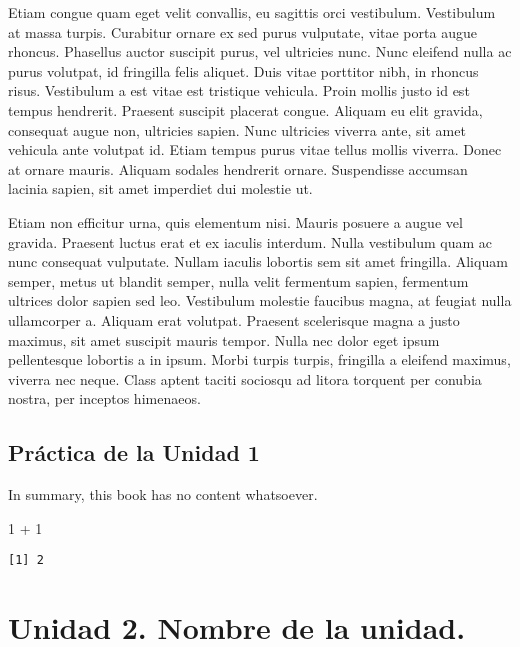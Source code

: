 \documentclass[
  letterpaper,
]{scrbook}
\newenvironment{Shaded}{\begin{snugshade}}{\end{snugshade}}
\newcommand{\DecValTok}[1]{\textcolor[rgb]{0.68,0.00,0.00}{#1}}
\newcommand{\SpecialCharTok}[1]{\textcolor[rgb]{0.37,0.37,0.37}{#1}}
\begin{document}
Etiam congue quam eget velit convallis, eu sagittis orci vestibulum.
Vestibulum at massa turpis. Curabitur ornare ex sed purus vulputate,
vitae porta augue rhoncus. Phasellus auctor suscipit purus, vel
ultricies nunc. Nunc eleifend nulla ac purus volutpat, id fringilla
felis aliquet. Duis vitae porttitor nibh, in rhoncus risus. Vestibulum a
est vitae est tristique vehicula. Proin mollis justo id est tempus
hendrerit. Praesent suscipit placerat congue. Aliquam eu elit gravida,
consequat augue non, ultricies sapien. Nunc ultricies viverra ante, sit
amet vehicula ante volutpat id. Etiam tempus purus vitae tellus mollis
viverra. Donec at ornare mauris. Aliquam sodales hendrerit ornare.
Suspendisse accumsan lacinia sapien, sit amet imperdiet dui molestie ut.

Etiam non efficitur urna, quis elementum nisi. Mauris posuere a augue
vel gravida. Praesent luctus erat et ex iaculis interdum. Nulla
vestibulum quam ac nunc consequat vulputate. Nullam iaculis lobortis sem
sit amet fringilla. Aliquam semper, metus ut blandit semper, nulla velit
fermentum sapien, fermentum ultrices dolor sapien sed leo. Vestibulum
molestie faucibus magna, at feugiat nulla ullamcorper a. Aliquam erat
volutpat. Praesent scelerisque magna a justo maximus, sit amet suscipit
mauris tempor. Nulla nec dolor eget ipsum pellentesque lobortis a in
ipsum. Morbi turpis turpis, fringilla a eleifend maximus, viverra nec
neque. Class aptent taciti sociosqu ad litora torquent per conubia
nostra, per inceptos himenaeos.

\chapter{Práctica de la Unidad 1}\label{pruxe1ctica-de-la-unidad-1}

\thispagestyle{primerapagina}

In summary, this book has no content whatsoever.

\begin{Shaded}
\begin{Highlighting}[]
\DecValTok{1} \SpecialCharTok{+} \DecValTok{1}
\end{Highlighting}
\end{Shaded}

\begin{verbatim}
[1] 2
\end{verbatim}

\part{Unidad 2. Nombre de la unidad.}
\end{document}
